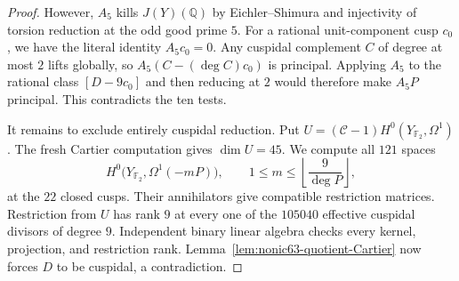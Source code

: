 \begin{proof}
However, $A_5$ kills $J(Y)(\mathbb Q)$ by Eichler--Shimura and
injectivity of torsion reduction at the odd good prime $5$.
For a rational unit-component cusp $c_0$, we have the literal
identity $A_5c_0=0$.
Any cuspidal complement $C$ of degree at most $2$ lifts globally,
so $A_5(C-(\deg C)c_0)$ is principal.
Applying $A_5$ to the rational class $[D-9c_0]$ and then reducing
at $2$ would therefore make $A_5P$ principal. This contradicts
the ten tests.

It remains to exclude entirely cuspidal reduction.
Put $U=(\mathcal C-1)H^0(Y_{\mathbb F_2},\Omega^1)$.
The fresh Cartier computation gives $\dim U=45$.
We compute all $121$ spaces
\[
 H^0\bigl(Y_{\mathbb F_2},\Omega^1(-mP)\bigr),\qquad
 1\leq m\leq\left\lfloor\frac9{\deg P}\right\rfloor,
\]
at the $22$ closed cusps. Their annihilators give compatible
restriction matrices. Restriction from $U$ has rank $9$ at every
one of the $105040$ effective cuspidal divisors of degree $9$.
Independent binary linear algebra checks every kernel, projection,
and restriction rank.
Lemma~\ref{lem:nonic63-quotient-Cartier} now forces $D$ to be
cuspidal, a contradiction.
\end{proof}
